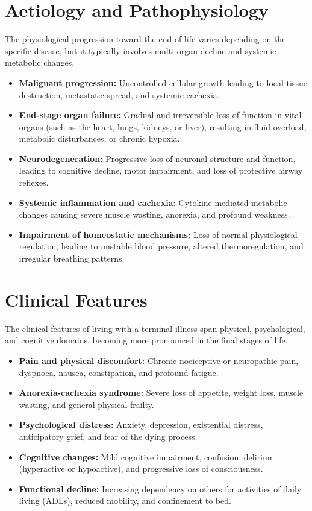 \section*{Aetiology and Pathophysiology}
The physiological progression toward the end of life varies depending on the specific disease, but it typically involves multi-organ decline and systemic metabolic changes.
\begin{itemize}
    \item \textbf{Malignant progression:} Uncontrolled cellular growth leading to local tissue destruction, metastatic spread, and systemic cachexia.
    \item \textbf{End-stage organ failure:} Gradual and irreversible loss of function in vital organs (such as the heart, lungs, kidneys, or liver), resulting in fluid overload, metabolic disturbances, or chronic hypoxia.
    \item \textbf{Neurodegeneration:} Progressive loss of neuronal structure and function, leading to cognitive decline, motor impairment, and loss of protective airway reflexes.
    \item \textbf{Systemic inflammation and cachexia:} Cytokine-mediated metabolic changes causing severe muscle wasting, anorexia, and profound weakness.
    \item \textbf{Impairment of homeostatic mechanisms:} Loss of normal physiological regulation, leading to unstable blood pressure, altered thermoregulation, and irregular breathing patterns.
\end{itemize}

\section*{Clinical Features}
The clinical features of living with a terminal illness span physical, psychological, and cognitive domains, becoming more pronounced in the final stages of life.
\begin{itemize}
    \item \textbf{Pain and physical discomfort:} Chronic nociceptive or neuropathic pain, dyspnoea, nausea, constipation, and profound fatigue.
    \item \textbf{Anorexia-cachexia syndrome:} Severe loss of appetite, weight loss, muscle wasting, and general physical frailty.
    \item \textbf{Psychological distress:} Anxiety, depression, existential distress, anticipatory grief, and fear of the dying process.
    \item \textbf{Cognitive changes:} Mild cognitive impairment, confusion, delirium (hyperactive or hypoactive), and progressive loss of consciousness.
    \item \textbf{Functional decline:} Increasing dependency on others for activities of daily living (ADLs), reduced mobility, and confinement to bed.
\end{itemize}

